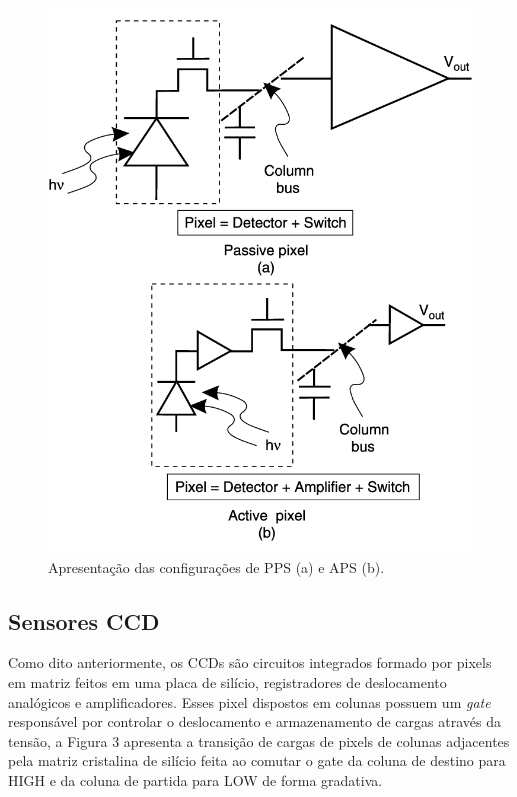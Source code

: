 \documentclass[10pt,a4paper,twocolumn]{article}
\begin{document}
	\begin{figure}[!h]
		\centering
		\includegraphics[scale=0.24]{imagens/passive_vs_active.png}
		\caption{Apresentação das configurações de PPS (a) e APS (b).}
	\end{figure}
	
	\subsection*{Sensores CCD}
	Como dito anteriormente, os CCDs são circuitos integrados formado por pixels em matriz feitos em uma placa de silício, registradores de deslocamento analógicos e amplificadores. Esses pixel dispostos em colunas possuem um \textit{gate} responsável por controlar o deslocamento e armazenamento de cargas através da tensão, a Figura 3 apresenta a transição de cargas de pixels de colunas adjacentes pela matriz cristalina de silício feita ao comutar o gate da coluna de destino para HIGH e da coluna de partida para LOW de forma gradativa.
	
\end{document}
